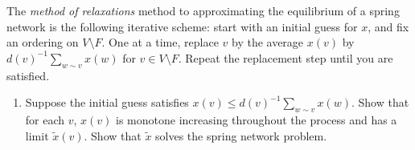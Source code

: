 \documentclass[11pt, oneside]{article}   	%
\theoremstyle{definition}
\begin{document}
\begin{enumerate}
The \emph{method of relaxations} method to approximating the equilibrium of a spring network is the following iterative scheme: start with an initial guess for $x$, and fix an ordering on $V \setminus F$. One at a time, replace $v$ by the average $x(v)$ by $d(v)^{-1} \sum_{w \sim v} x(w)$ for $v \in V \setminus F$. Repeat the replacement step until you are satisfied.
\begin{enumerate}
\item Suppose the initial guess satisfies $x(v)\leq d(v)^{-1} \sum_{w \sim v} x(w)$. Show that for each $v$, $x(v)$ is monotone increasing throughout the process and has a limit $\tilde{x}(v)$. Show that $\tilde x$ solves the spring network problem.
\end{enumerate}

\end{enumerate}
\end{document}
